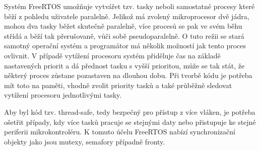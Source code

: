         Systém FreeRTOS umožňuje vytvářet tzv. tasky neboli samostatné procesy které běží z pohledu uživatele paralelně. Jelikož má zvolený mikroprocesor dvě jádra, mohou dva tasky běžet skutečně paralelně, více procesů se pak ve svém běhu střídá a běží tak přerušovaně, vůči sobě pseudoparalelně. O tuto režii se stará samotný operační systém a programátor má několik možností jak tento proces ovlivnit. V případě vytížení procesoru systém přiděluje čas na základě nastavených priorit a dá přednost tasku s vyšší prioritou, může se tak stát, že některý proces zůstane pozastaven na dlouhou dobu. Při tvorbě kódu je potřeba mít toto na paměti, vhodně zvolit priority tasků a také průběžně sledovat vytížení procesoru jednotlivými tasky.  

        Aby byl kód tzv. thread-safe, tedy bezpečný pro přístup z více vláken, je potřeba ošetřit případy, kdy více tasků pracuje se stejnými daty nebo přistupuje ke stejné periferii mikrokontroléru. K tomuto účelu FreeRTOS nabízí synchronizační objekty jako jsou mutexy, semafory případně fronty. 

